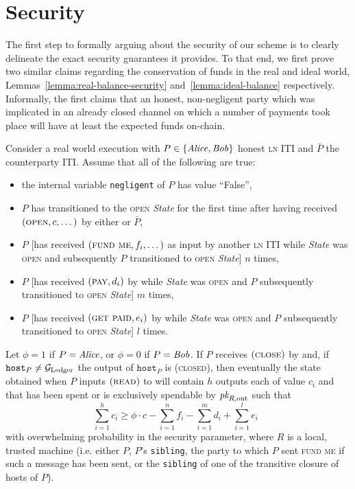 \section{Security}
  The first step to formally arguing about the security of our scheme is to
  clearly delineate the exact security guarantees it provides. To that end, we
  first prove two similar claims regarding the conservation of funds in the real
  and ideal world, Lemmas~\ref{lemma:real-balance-security}
  and~\ref{lemma:ideal-balance} respectively. Informally, the first claims that
  an honest, non-negligent party which was implicated in an already closed
  channel on which a number of payments took place will have at least the
  expected funds on-chain.

\begin{lemma}
\label{lemma:real-balance-security}
  Consider a real world execution with $P \in \{\mathit{Alice}, \mathit{Bob}\}$ honest
  \textsc{ln} ITI and $\bar{P}$ the counterparty ITI. Assume that all of the
  following are true:
  \begin{itemize}
    \item the internal variable \texttt{negligent} of $P$ has value ``False'',
    \item $P$ has transitioned to the \textsc{open} \textit{State} for the first
    time after having received $(\textsc{open}, c, \dots)$ by either
    \environment or $\bar{P}$,
    \item $P$ [has received $(\textsc{fund me}, f_i, \dots)$ as input by another
    \textsc{ln} ITI while \textit{State} was \textsc{open} and subsequently $P$
    transitioned to \textsc{open} \textit{State}] $n$ times,
    \item $P$ [has received $(\textsc{pay}, d_i)$ by \environment while
    \textit{State} was \textsc{open} and $P$ subsequently transitioned to
    \textsc{open} \textit{State}] $m$ times,
    \item $P$ [has received $(\textsc{get paid}, e_i)$ by \environment while
    \textit{State} was \textsc{open} and $P$ subsequently transitioned to
    \textsc{open} \textit{State}] $l$ times.
  \end{itemize}
  Let $\phi = 1$ if $P = \mathit{Alice}$, or $\phi = 0$ if $P = \mathit{Bob}$. If $P$ receives
  $(\textsc{close})$ by \environment and, if $\texttt{host}_P \neq \mathcal{G}_{\mathrm{Ledger}}$ the
  output of $\texttt{host}_P$ is (\textsc{closed}), then eventually the state
  obtained when $P$ inputs $(\textsc{read})$ to \ledger will contain $h$ outputs
  each of value $c_i$ and that has been spent or is exclusively spendable by
  $\textit{pk}_{R, \mathrm{out}}$ such that
  \begin{equation}
  \label{lemma:real-balance-security:ineq}
    \sum\limits_{i=1}^h c_i \geq \phi \cdot c - \sum\limits_{i=1}^n f_i -
    \sum\limits_{i=1}^m d_i + \sum\limits_{i=1}^l e_i \enspace
  \end{equation}
  with overwhelming probability in the security parameter, where $R$ is a local,
  trusted machine (i.e. either $P$, $P$'s \texttt{sibling}, the party to which
  $P$ sent \textsc{fund me} if such a message has been sent, or the
  \texttt{sibling} of one of the transitive closure of hosts of $P$).
\end{lemma}

